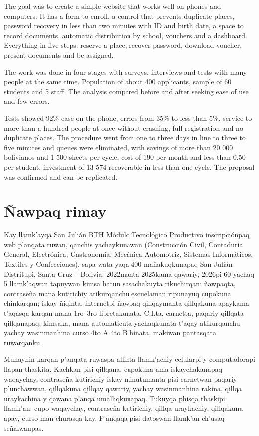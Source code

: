 The goal was to create a simple website that works well on phones and computers. It has a form to enroll, a control that prevents duplicate places, password recovery in less than two minutes with ID and birth date, a space to record documents, automatic distribution by school, vouchers and a dashboard. Everything in five steps: reserve a place, recover password, download voucher, present documents and be assigned.

The work was done in four stages with surveys, interviews and tests with many people at the same time. Population of about 400 applicants, sample of 60 students and 5 staff. The analysis compared before and after seeking ease of use and few errors.

Tests showed 92\% ease on the phone, errors from 35\% to less than 5\%, service to more than a hundred people at once without crashing, full registration and no duplicate places. The procedure went from one to three days in line to three to five minutes and queues were eliminated, with savings of more than 20 000 bolivianos and 1 500 sheets per cycle, cost of 190 per month and less than 0.50 per student, investment of 13 574 recoverable in less than one cycle. The proposal was confirmed and can be replicated.


\newpage

\section*{Ñawpaq rimay}
Kay llamk'ayqa San Julián BTH Módulo Tecnológico Productivo inscripciónpaq web p'anqata ruwan, qanchis yachaykunawan (Construcción Civil, Contaduría General, Electrónica, Gastronomía, Mecánica Automotriz, Sistemas Informáticos, Textiles y Confecciones), sapa wata yaqa 400 mañakuqkunapaq San Julián Distritupi, Santa Cruz -- Bolivia. 2022manta 2025kama qawariy, 2026pi 60 yachaq 5 llamk'aqwan tapuywan kimsa hatun sasachakuyta rikuchirqan: ñawpaqta, contraseña mana kutirichiy atikurqanchu escuelaman ripunayuq cupokuna chinkarqan; iskay ñiqinta, internetpi ñawpaq qillqaymanta qillqakuna apaykama t'aqasqa karqan mana 1ro--3ro libretakunata, C.I.ta, carnetta, paqariy qillqata qillqanapaq; kimsaka, mana automaticuta yachaqkunata t'aqay atikurqanchu yachay wasinmanhina curso 4to A 4to B hinata, makiwan pantasqata ruwarqanku.

Munaynin karqan p'anqata ruwaspa allinta llamk'achiy celularpi y computadorapi llapan thaskita. Kachkan pisi qillqana, cupokuna ama iskaychakanapaq waqaychay, contraseña kutirichiy iskay minutumanta pisi carnetwan paqariy p'unchawwan, qillqakuna qillqay qawariy, yachay wasinmanhina rakina, qillqa uraykachina y qawana p'anqa umalliqkunapaq. Tukuyqa phisqa thaskipi llamk'an: cupo waqaychay, contraseña kutirichiy, qillqa uraykachiy, qillqakuna apay, curso-man churasqa kay. P'anqaqa pisi datoswan llamk'an ch'usaq señalwanpas.

